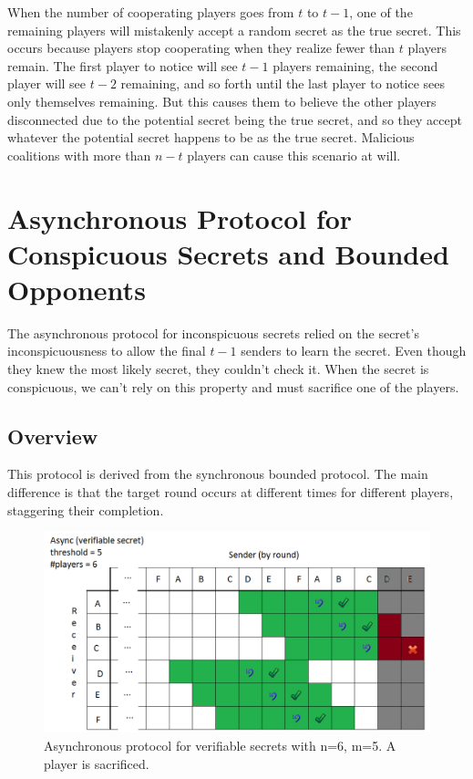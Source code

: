 \documentclass{dalcsthesis}
\begin{document}
When the number of cooperating players goes from $t$ to $t-1$, one of the remaining players will mistakenly accept a random secret as the true secret. This occurs because players stop cooperating when they realize fewer than $t$ players remain. The first player to notice will see $t-1$ players remaining, the second player will see $t-2$ remaining, and so forth until the last player to notice sees only themselves remaining. But this causes them to believe the other players disconnected due to the potential secret being the true secret, and so they accept whatever the potential secret happens to be as the true secret. Malicious coalitions with more than $n-t$ players can cause this scenario at will.

\chapter{Asynchronous Protocol for Conspicuous Secrets and Bounded Opponents}

The asynchronous protocol for inconspicuous secrets relied on the secret's inconspicuousness to allow the final $t-1$ senders to learn the secret. Even though they knew the most likely secret, they couldn't check it. When the secret is conspicuous, we can't rely on this property and must sacrifice one of the players.

\section{Overview}

This protocol is derived from the synchronous bounded protocol. The main difference is that the target round occurs at different times for different players, staggering their completion. 
 
\begin{figure}
\includegraphics[width=\textwidth]{../../Graphics/AsyncVerifiedSecret_n6m5.png}
\caption{Asynchronous protocol for verifiable secrets with n=6, m=5. A player is sacrificed.}
\label{AsyncExample1}
\end{figure}
\end{document}
